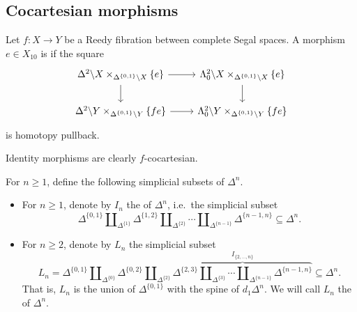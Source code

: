 \documentclass[main.tex]{subfiles}
\begin{document}
\subsection{Cocartesian morphisms}
\label{ssc:cocartesian_morphisms}

\begin{definition}
  Let $f\colon X \to Y$ be a Reedy fibration between complete Segal spaces. A morphism $e \in X_{10}$ is  if the square
  \begin{equation*}
    \begin{tikzcd}
      \Delta^{2} \backslash X \times_{\Delta^{\{0, 1\}} \backslash X} \{e\}
      \arrow[r]
      \arrow[d]
      & \Lambda^{2}_{0} \backslash X \times_{\Delta^{\{0, 1\}} \backslash X} \{e\}
      \arrow[d]
      \\
      \Delta^{2} \backslash Y \times_{\Delta^{\{0, 1\}} \backslash Y} \{fe\}
      \arrow[r]
      & \Lambda^{2}_{0} \backslash Y \times_{\Delta^{\{0, 1\}} \backslash Y} \{fe\}
    \end{tikzcd}
  \end{equation*}
  is homotopy pullback.
\end{definition}

\begin{example}
  Identity morphisms are clearly $f$-cocartesian.
\end{example}

\begin{definition}
  For $n \geq 1$, define the following simplicial subsets of $\Delta^{n}$.

  \begin{itemize}
    \item For $n \geq 1$, denote by $I_{n}$ the  of $\Delta^{n}$, i.e.\ the simplicial subset
      \begin{equation*}
        \Delta^{\{0, 1\}} \amalg_{\Delta^{\{1\}}} \Delta^{\{1, 2\}} \amalg_{\Delta^{\{2\}}} \cdots \amalg_{\Delta^{\{n-1\}}} \Delta^{\{n-1, n\}} \subseteq \Delta^{n}.
      \end{equation*}

    \item For $n \geq 2$, denote by $L_{n}$ the simplicial subset
      \begin{equation*}
        L_{n} = \Delta^{\{0, 1\}} \amalg_{\Delta^{\{0\}}} \Delta^{\{0, 2\}} \amalg_{\Delta^{\{2\}}} \overbrace{\Delta^{\{2, 3\}} \amalg_{\Delta^{\{3\}}}\cdots \amalg_{\Delta^{\{n-1\}}} \Delta^{\{n-1, n\}}}^{I_{\{2, \ldots, n\}}} \subseteq \Delta^{n}.
      \end{equation*}
      That is, $L_{n}$ is the union of $\Delta^{\{0, 1\}}$ with the spine of $d_{1}\Delta^{n}$. We will call $L_{n}$ the  of $\Delta^{n}$.
  \end{itemize}
\end{definition}
\end{document}
